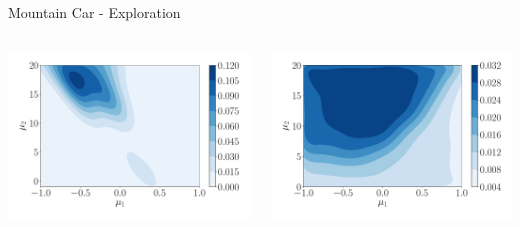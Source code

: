 \begin{frame}{Mountain Car - Exploration}
\begin{columns}
	\begin{column}{0.5\linewidth}
	\centering
		\includegraphics[width=\linewidth]{Images/MCgainPGPE}
	\end{column}
	
	\begin{column}{0.5\linewidth}
	\centering
		\includegraphics[width=\linewidth]{Images/MCgainOPTIMIST}
	\end{column}	
\end{columns}
\end{frame}